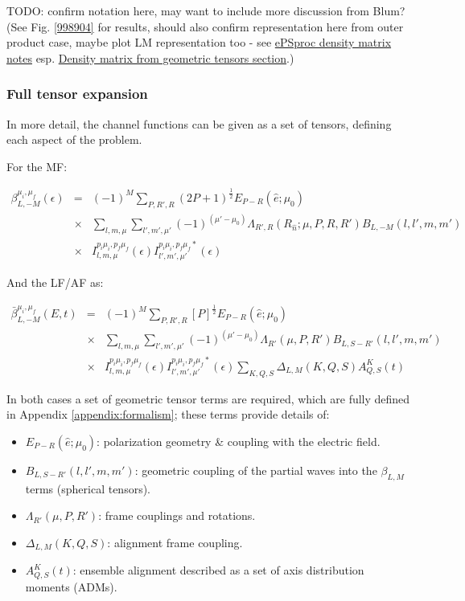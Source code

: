TODO: confirm notation here, may want to include more discussion from Blum? (See Fig. \ref{998904} for results, should also confirm representation here from outer product case, maybe plot LM representation too - see \href{https://epsproc.readthedocs.io/en/dev/methods/density_mat_notes_demo_300821.html}{ePSproc density matrix notes} esp. \href{https://epsproc.readthedocs.io/en/dev/methods/density_mat_notes_demo_300821.html#Density-matrix-from-geometric-tensors}{Density matrix from geometric tensors section}.)



\subsubsection{Full tensor expansion}

In more detail, the channel functions can be given as a set of tensors, defining each aspect of the problem.

For the MF:

\begin{eqnarray}
\beta_{L,-M}^{\mu_{i},\mu_{f}}(\epsilon) & = & (-1)^{M}\sum_{P,R',R}(2P+1)^{\frac{1}{2}}{E_{P-R}(\hat{e};\mu_{0})}\\
 & \times &\sum_{l,m,\mu}\sum_{l',m',\mu'}(-1)^{(\mu'-\mu_{0})}{\Lambda_{R',R}(R_{\hat{n}};\mu,P,R,R')B_{L,-M}(l,l',m,m')}\\
 & \times & I_{l,m,\mu}^{p_{i}\mu_{i},p_{f}\mu_{f}}(\epsilon)I_{l',m',\mu'}^{p_{i}\mu_{i},p_{f}\mu_{f}*}(\epsilon)\label{eq:BLM-tensor-MF}
\end{eqnarray}

And the LF/AF as:

\begin{eqnarray}
\bar{\beta}_{L,-M}^{\mu_{i},\mu_{f}}(E,t) & = & (-1)^{M}\sum_{P,R',R}{[P]^{\frac{1}{2}}}{E_{P-R}(\hat{e};\mu_{0})}\\
 & \times &\sum_{l,m,\mu}\sum_{l',m',\mu'}(-1)^{(\mu'-\mu_{0})}{\Lambda_{R'}(\mu,P,R')B_{L,S-R'}(l,l',m,m')}\\
 & \times &I_{l,m,\mu}^{p_{i}\mu_{i},p_{f}\mu_{f}}(\epsilon)I_{l',m',\mu'}^{p_{i}\mu_{i},p_{f}\mu_{f}*}(\epsilon)\sum_{K,Q,S}\Delta_{L,M}(K,Q,S)A_{Q,S}^{K}(t)\label{eq:BLM-tensor-AF}
\end{eqnarray}

In both cases a set of geometric tensor terms are required, which are fully defined in Appendix \ref{appendix:formalism}; these terms provide details of:

\begin{itemize}
\item ${E_{P-R}(\hat{e};\mu_{0})}$: polarization geometry \& coupling with the electric field.
\item $B_{L,S-R'}(l,l',m,m')$: geometric coupling of the partial waves into the $\beta_{L,M}$ terms (spherical tensors).
\item $\Lambda_{R'}(\mu,P,R')$: frame couplings and rotations.
\item $\Delta_{L,M}(K,Q,S)$: alignment frame coupling.
\item $A_{Q,S}^{K}(t)$: ensemble alignment described as a set of axis distribution moments (ADMs).
\end{itemize}

